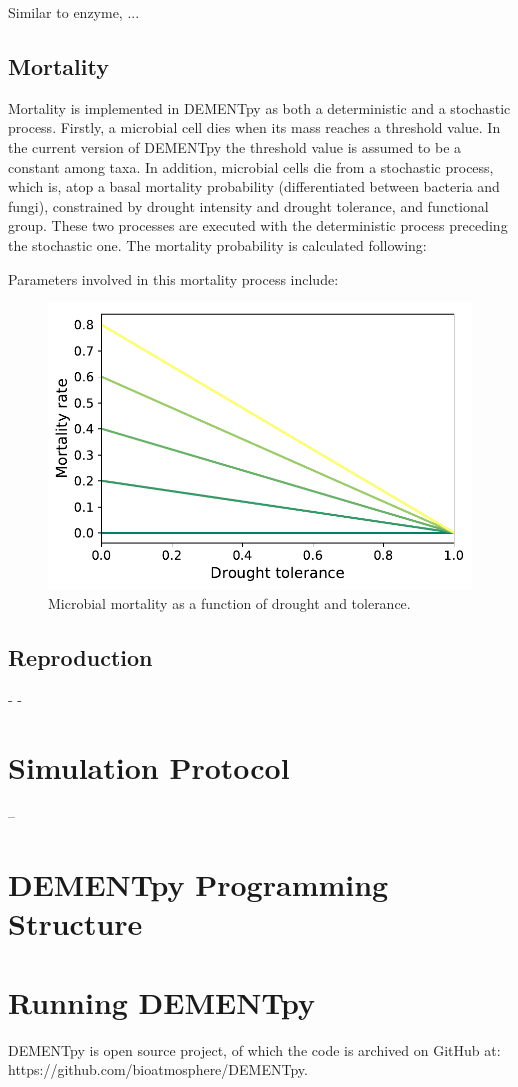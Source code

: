 \documentclass[12pt, oneside, titlepage]{article}   	%
\begin{document}
Similar to enzyme, ...

\subsection{Mortality}
Mortality is implemented in DEMENTpy as both a deterministic and a stochastic process. Firstly, a microbial cell dies when its mass reaches a threshold value. In the current version of DEMENTpy the threshold value is assumed to be a constant among taxa. In addition, microbial cells die from a stochastic process, which is, atop a basal mortality probability (differentiated between bacteria and fungi), constrained by drought intensity and drought tolerance, and functional group. These two processes are executed with the deterministic process preceding the stochastic one. The mortality probability is calculated following:

Parameters involved in this mortality process include:

\begin{figure}[H]
  \centering
  \includegraphics[width=\linewidth]{Fig2_Microbial_mortality_prob.pdf}
  \caption{Microbial mortality as a function of drought and tolerance.}
  \label{fig:mortality}
\end{figure}


\subsection{Reproduction}
-
-



\section{Simulation Protocol}
--

\section{DEMENTpy Programming Structure}




\section{Running DEMENTpy}

DEMENTpy is open source project, of which the code is archived on GitHub at: https://github.com/bioatmosphere/DEMENTpy.
\end{document}
